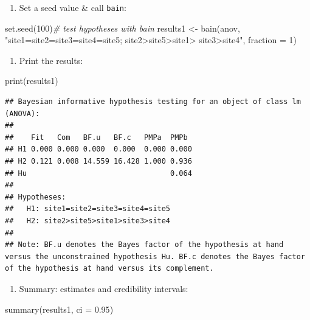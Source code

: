 \documentclass[
]{book}
\newenvironment{Shaded}{\begin{snugshade}}{\end{snugshade}}
\newcommand{\AttributeTok}[1]{\textcolor[rgb]{0.77,0.63,0.00}{#1}}
\newcommand{\CommentTok}[1]{\textcolor[rgb]{0.56,0.35,0.01}{\textit{#1}}}
\newcommand{\DecValTok}[1]{\textcolor[rgb]{0.00,0.00,0.81}{#1}}
\newcommand{\FloatTok}[1]{\textcolor[rgb]{0.00,0.00,0.81}{#1}}
\newcommand{\FunctionTok}[1]{\textcolor[rgb]{0.00,0.00,0.00}{#1}}
\newcommand{\NormalTok}[1]{#1}
\newcommand{\OtherTok}[1]{\textcolor[rgb]{0.56,0.35,0.01}{#1}}
\newcommand{\StringTok}[1]{\textcolor[rgb]{0.31,0.60,0.02}{#1}}
\providecommand{\tightlist}{%
  \setlength{\itemsep}{0pt}\setlength{\parskip}{0pt}}
\begin{document}
\begin{enumerate}
\def\labelenumi{\arabic{enumi})}
\setcounter{enumi}{2}
\tightlist
\item
  Set a seed value \& call \texttt{bain}:
\end{enumerate}

\begin{Shaded}
\begin{Highlighting}[]
\FunctionTok{set.seed}\NormalTok{(}\DecValTok{100}\NormalTok{)}\CommentTok{\# test hypotheses with bain}
\NormalTok{results1 }\OtherTok{\textless{}{-}} \FunctionTok{bain}\NormalTok{(anov, }\StringTok{"site1=site2=site3=site4=site5; site2\textgreater{}site5\textgreater{}site1\textgreater{}}
\StringTok{site3\textgreater{}site4"}\NormalTok{, }\AttributeTok{fraction =} \DecValTok{1}\NormalTok{)}
\end{Highlighting}
\end{Shaded}

\begin{enumerate}
\def\labelenumi{\arabic{enumi})}
\setcounter{enumi}{3}
\tightlist
\item
  Print the results:
\end{enumerate}

\begin{Shaded}
\begin{Highlighting}[]
\FunctionTok{print}\NormalTok{(results1)}
\end{Highlighting}
\end{Shaded}

\begin{verbatim}
## Bayesian informative hypothesis testing for an object of class lm (ANOVA):
## 
##    Fit   Com   BF.u   BF.c   PMPa  PMPb 
## H1 0.000 0.000 0.000  0.000  0.000 0.000
## H2 0.121 0.008 14.559 16.428 1.000 0.936
## Hu                                 0.064
## 
## Hypotheses:
##   H1: site1=site2=site3=site4=site5
##   H2: site2>site5>site1>site3>site4
## 
## Note: BF.u denotes the Bayes factor of the hypothesis at hand versus the unconstrained hypothesis Hu. BF.c denotes the Bayes factor of the hypothesis at hand versus its complement.
\end{verbatim}

\begin{enumerate}
\def\labelenumi{\arabic{enumi})}
\setcounter{enumi}{4}
\tightlist
\item
  Summary: estimates and credibility intervals:
\end{enumerate}

\begin{Shaded}
\begin{Highlighting}[]
\FunctionTok{summary}\NormalTok{(results1, }\AttributeTok{ci =} \FloatTok{0.95}\NormalTok{)}
\end{Highlighting}
\end{Shaded}
\end{document}
